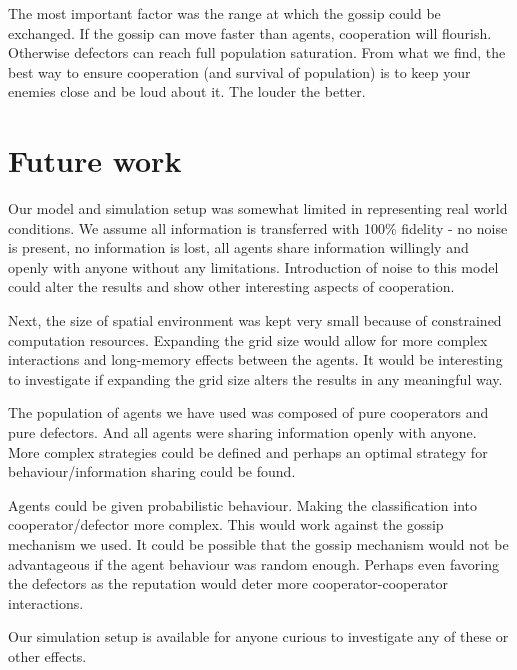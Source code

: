 \documentclass[english]{article}
\begin{document}
The most important factor was the range at which the gossip could be exchanged.
If the gossip can move faster than agents, cooperation will flourish.
Otherwise defectors can reach full population saturation.
From what we find, the best way to ensure cooperation (and survival of population) is to keep your enemies close and be loud about it. The louder the better.



\section{Future work}
Our model and simulation setup was somewhat limited in representing real world conditions.
We assume all information is transferred with 100\% fidelity - no noise is present, no information is lost, all agents share information willingly and openly with anyone without any limitations. Introduction of noise to this model could alter the results and show other interesting aspects of cooperation.

Next, the size of spatial environment was kept very small because of constrained computation resources. Expanding the grid size would allow for more complex interactions and long-memory effects between the agents.
It would be interesting to investigate if expanding the grid size alters the results in any meaningful way.

The population of agents we have used was composed of pure cooperators and pure defectors.
And all agents were sharing information openly with anyone.
More complex strategies could be defined and perhaps an optimal strategy for behaviour/information sharing could be found.

Agents could be given probabilistic behaviour. Making the classification into cooperator/defector more complex. This would work against the gossip mechanism we used.
It could be possible that the gossip mechanism would not be advantageous if the agent behaviour was random enough.
Perhaps even favoring the defectors as the reputation would deter more cooperator-cooperator interactions.

Our simulation setup is available
for anyone curious to investigate any of these or other effects.



\pagebreak

\end{document}
